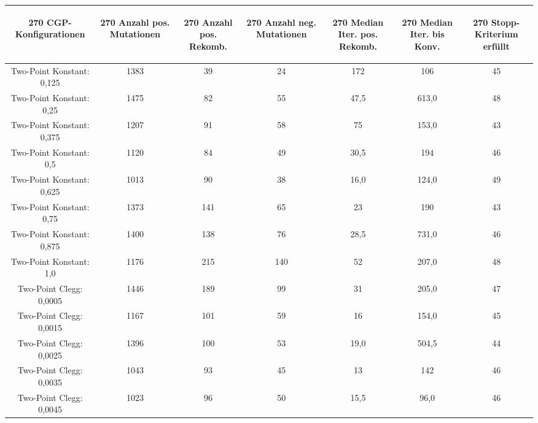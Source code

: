 \begin{table}[H]
	\centering
	\begin{tabular}{c | c | c | c | c | c | c}
		\begin{turn}{270} \textbf{CGP-Konfigurationen} \end{turn} & \begin{turn}{270} \textbf{Anzahl pos. Mutationen} \end{turn} & \begin{turn}{270} \textbf{Anzahl pos. Rekomb.} \end{turn} & \begin{turn}{270} \textbf{Anzahl neg. Mutationen} \end{turn} & \begin{turn}{270} \textbf{Median Iter. pos. Rekomb.} \end{turn} & \begin{turn}{270} \textbf{Median Iter. bis Konv.} \end{turn} & \begin{turn}{270} \textbf{Stopp-Kriterium erfüllt} \end{turn}\\
		\hline
		Two-Point Konstant: 0,125 & 1383 & 39 & 24 & 172 & 106 & 45\\
		\hline
		Two-Point Konstant: 0,25 & 1475 & 82 & 55 & 47,5 & 613,0 & 48\\
		\hline
		Two-Point Konstant: 0,375 & 1207 & 91 & 58 & 75 & 153,0 & 43\\
		\hline
		Two-Point Konstant: 0,5 & 1120 & 84 & 49 & 30,5 & 194 & 46\\
		\hline
		Two-Point Konstant: 0,625 & 1013 & 90 & 38 & 16,0 & 124,0 & 49\\
		\hline
		Two-Point Konstant: 0,75 & 1373 & 141 & 65 & 23 & 190 & 43\\
		\hline
		Two-Point Konstant: 0,875 & 1400 & 138 & 76 & 28,5 & 731,0 & 46\\
		\hline
		Two-Point Konstant: 1,0 & 1176 & 215 & 140 & 52 & 207,0 & 48\\
		\hline
		Two-Point Clegg: 0,0005 & 1446 & 189 & 99 & 31 & 205,0 & 47\\
		\hline
		Two-Point Clegg: 0,0015 & 1167 & 101 & 59 & 16 & 154,0 & 45\\
		\hline
		Two-Point Clegg: 0,0025 & 1396 & 100 & 53 & 19,0 & 504,5 & 44\\
		\hline
		Two-Point Clegg: 0,0035 & 1043 & 93 & 45 & 13 & 142 & 46\\
		\hline
		Two-Point Clegg: 0,0045 & 1023 & 96 & 50 & 15,5 & 96,0 & 46\\

\end{tabular}
\end{table}

